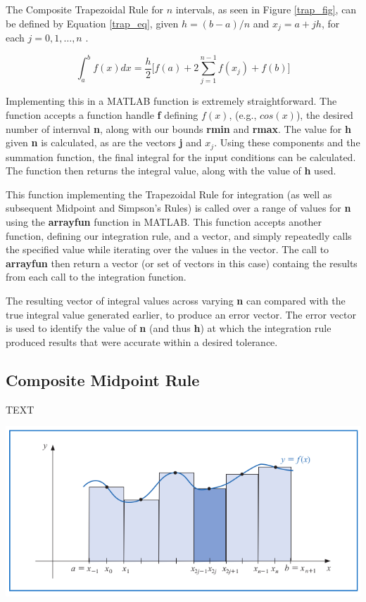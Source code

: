 \documentclass[a4paper]{article}
\begin{document}
The Composite Trapezoidal Rule for $n$ intervals, as seen in Figure \ref{trap_fig}, can be defined by Equation \ref{trap_eq}, given $h=(b-a)/n$ and $x_j=a+jh$, for each $j=0,1,\dots,n$ \citep{burden2010}.

\begin{equation}
\int_{a}^b f(x) dx = \frac{h}{2} \Bigg[ f(a) + 2 \sum_{j=1}^{n-1} f(x_j) + f(b) \Bigg]
\label{trap_eq}
\end{equation}

Implementing this in a MATLAB function is extremely straightforward. The function accepts a function handle \textbf{f} defining $f(x)$, (e.g., $cos(x)$), the desired number of internval \textbf{n}, along with our bounds \textbf{rmin} and \textbf{rmax}. The value for \textbf{h} given \textbf{n} is calculated, as are the vectors \textbf{j} and \textbf{$x_j$}. Using these components and the summation function, the final integral for the input conditions can be calculated. The function then returns the integral value, along with the value of \textbf{h} used.

This function implementing the Trapezoidal Rule for integration (as well as subsequent Midpoint and Simpson's Rules) is called over a range of values for \textbf{n} using the \textbf{arrayfun} function in MATLAB. This function accepts another function, defining our integration rule, and a vector, and simply repeatedly calls the specified value while iterating over the values in the vector. The call to \textbf{arrayfun} then return a vector (or set of vectors in this case) containg the results from each call to the integration function.

 The resulting vector of integral values across varying \textbf{n} can compared with the true integral value generated earlier, to produce an error vector. The error vector is used to identify the value of \textbf{n} (and thus \textbf{h}) at which the integration rule produced results that were accurate within a desired tolerance.



\subsection{Composite Midpoint Rule}\label{method:midpoint}
TEXT

\begin{center}
	\includegraphics[width=1\textwidth]{../additional/midpoint_fig.png}
	\label{mid_fig}
\end{center}
\end{document}
